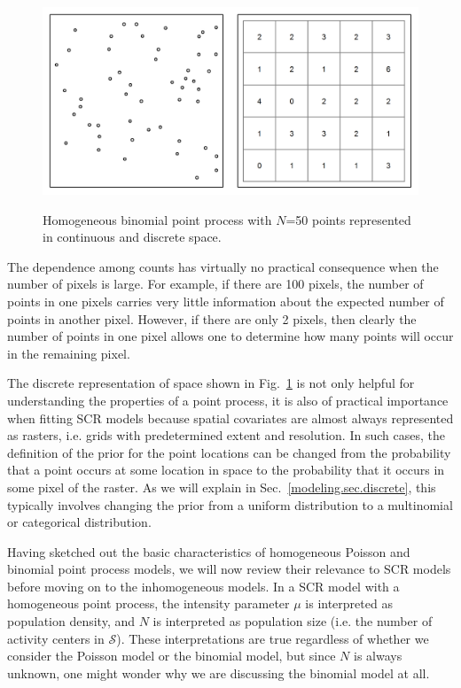 \begin{figure}%
\centering
\includegraphics[width=\textwidth]{Ch11-Statespace/figs/homoPlots}
\label{state-space.fig.homo}
\caption{Homogeneous binomial point process with $N$=50 points
  represented in continuous and discrete space.}
\end{figure}

The dependence among counts has virtually
no practical consequence when the number of pixels is large. For
example, if there are 100 pixels, the number of points in one pixels
carries very little information about the expected number of points in another
pixel. However, if there are only 2 pixels, then clearly the number of
points in one pixel allows one to determine how many points will occur in the
remaining pixel.

The discrete representation of space shown in
Fig.~\ref{state-space.fig.homo} is not only helpful for understanding
the properties of a point process, it is also of practical importance
when fitting SCR models because spatial covariates are almost always
represented as rasters, i.e. grids with predetermined extent and
resolution. In such cases, the definition of the prior for
the point locations can be changed from the probability that a point
occurs at some location in space to the probability that it occurs in
some pixel of the raster. As we will explain in
Sec.~\ref{modeling.sec.discrete}, this typically involves changing the
prior from a uniform distribution to a multinomial or categorical
distribution.

Having sketched out the basic characteristics
of homogeneous Poisson and binomial point process models, %
we will now review
their relevance to SCR models before moving on
to the inhomogeneous models. %
In a SCR model with a homogeneous point process, the intensity
parameter $\mu$ is interpreted as population density, and $N$ is
interpreted as population size (i.e. the
  number of activity centers in $\mathcal{S}$). These interpretations
are true regardless of whether we consider the
Poisson model or the binomial model, but since $N$ is always unknown, one
might wonder why we are discussing the binomial model at all. %

